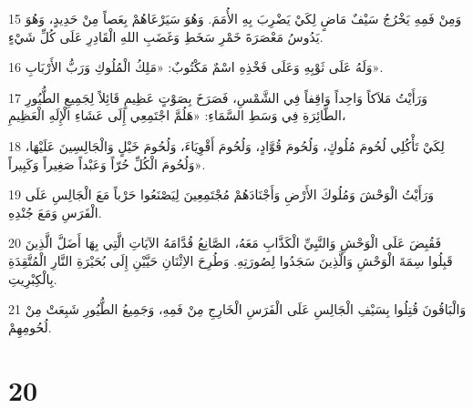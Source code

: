 \par 15 وَمِنْ فَمِهِ يَخْرُجُ سَيْفٌ مَاضٍ لِكَيْ يَضْرِبَ بِهِ الأُمَمَ. وَهُوَ سَيَرْعَاهُمْ بِعَصاً مِنْ حَدِيدٍ، وَهُوَ يَدُوسُ مَعْصَرَةَ خَمْرِ سَخَطِ وَغَضَبِ اللهِ الْقَادِرِ عَلَى كُلِّ شَيْءٍ.
\par 16 وَلَهُ عَلَى ثَوْبِهِ وَعَلَى فَخْذِهِ اسْمٌ مَكْتُوبٌ: «مَلِكُ الْمُلُوكِ وَرَبُّ الأَرْبَابِ».
\par 17 وَرَأَيْتُ مَلاَكاً وَاحِداً وَاقِفاً فِي الشَّمْسِ، فَصَرَخَ بِصَوْتٍ عَظِيمٍ قَائِلاً لِجَمِيعِ الطُّيُورِ الطَّائِرَةِ فِي وَسَطِ السَّمَاءِ: «هَلُمَّ اجْتَمِعِي إِلَى عَشَاءِ الْإِلَهِ الْعَظِيمِ،
\par 18 لِكَيْ تَأْكُلِي لُحُومَ مُلُوكٍ، وَلُحُومَ قُوَّادٍ، وَلُحُومَ أَقْوِيَاءَ، وَلُحُومَ خَيْلٍ وَالْجَالِسِينَ عَلَيْهَا، وَلُحُومَ الْكُلِّ حُرّاً وَعَبْداً صَغِيراً وَكَبِيراً».
\par 19 وَرَأَيْتُ الْوَحْشَ وَمُلُوكَ الأَرْضِ وَأَجْنَادَهُمْ مُجْتَمِعِينَ لِيَصْنَعُوا حَرْباً مَعَ الْجَالِسِ عَلَى الْفَرَسِ وَمَعَ جُنْدِهِ.
\par 20 فَقُبِضَ عَلَى الْوَحْشِ وَالنَّبِيِّ الْكَذَّابِ مَعَهُ، الصَّانِعُ قُدَّامَهُ الآيَاتِ الَّتِي بِهَا أَضَلَّ الَّذِينَ قَبِلُوا سِمَةَ الْوَحْشِ وَالَّذِينَ سَجَدُوا لِصُورَتِهِ. وَطُرِحَ الاِثْنَانِ حَيَّيْنِ إِلَى بُحَيْرَةِ النَّارِ الْمُتَّقِدَةِ بِالْكِبْرِيتِ.
\par 21 وَالْبَاقُونَ قُتِلُوا بِسَيْفِ الْجَالِسِ عَلَى الْفَرَسِ الْخَارِجِ مِنْ فَمِهِ، وَجَمِيعُ الطُّيُورِ شَبِعَتْ مِنْ لُحُومِهِمْ.

\chapter{20}

